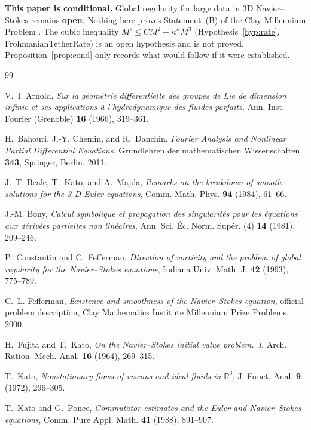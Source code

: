 \documentclass[11pt,reqno]{amsart}
\theoremstyle{definition}
\theoremstyle{remark}
\begin{document}
\textbf{This paper is conditional.} Global regularity for large data in 3D Navier--Stokes remains \textbf{open}. Nothing here proves Statement~(B) of the Clay Millennium Problem \cite{Fefferman2000}. The cubic inequality $M'\le CM^2-\kappa''M^3$ (Hypothesis~\ref{hyp:rate}, FrohmanianTetherRate) is an open hypothesis and is not proved. Proposition~\ref{prop:cond} only records what would follow if it were established.

\begin{thebibliography}{99}

 V.~I. Arnold, \emph{Sur la g\'eom\'etrie diff\'erentielle des groupes de Lie de dimension infinie et ses applications \`a l'hydrodynamique des fluides parfaits}, Ann. Inst. Fourier (Grenoble) \textbf{16} (1966), 319--361.

 H.~Bahouri, J.-Y. Chemin, and R.~Danchin, \emph{Fourier Analysis and Nonlinear Partial Differential Equations}, Grundlehren der mathematischen Wissenschaften \textbf{343}, Springer, Berlin, 2011.

 J.~T. Beale, T.~Kato, and A.~Majda, \emph{Remarks on the breakdown of smooth solutions for the 3-D Euler equations}, Comm. Math. Phys. \textbf{94} (1984), 61--66.

 J.-M. Bony, \emph{Calcul symbolique et propagation des singularit\'es pour les \'equations aux d\'eriv\'ees partielles non lin\'eaires}, Ann. Sci. \'Ec. Norm. Sup\'er. (4) \textbf{14} (1981), 209--246.

 P.~Constantin and C.~Fefferman, \emph{Direction of vorticity and the problem of global regularity for the Navier--Stokes equations}, Indiana Univ. Math. J. \textbf{42} (1993), 775--789.

 C.~L. Fefferman, \emph{Existence and smoothness of the Navier--Stokes equation}, official problem description, Clay Mathematics Institute Millennium Prize Problems, 2000.

 H.~Fujita and T.~Kato, \emph{On the Navier--Stokes initial value problem.~I}, Arch. Ration. Mech. Anal. \textbf{16} (1964), 269--315.

 T.~Kato, \emph{Nonstationary flows of viscous and ideal fluids in $\mathbb R^3$}, J. Funct. Anal. \textbf{9} (1972), 296--305.

 T.~Kato and G.~Ponce, \emph{Commutator estimates and the Euler and Navier--Stokes equations}, Comm. Pure Appl. Math. \textbf{41} (1988), 891--907.


\end{thebibliography}
\end{document}
